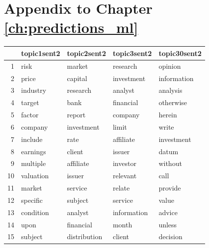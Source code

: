 
\section{Appendix to Chapter \ref{ch:predictions_ml}}

\begin{table}[ht]
\centering
\begin{tabular}{rllll}
  \hline
 & topic1sent2 & topic2sent2 & topic3sent2 & topic30sent2 \\ 
  \hline
1 & risk & market & research & opinion \\ 
  2 & price & capital & investment & information \\ 
  3 & industry & research & analyst & analysis \\ 
  4 & target & bank & financial & otherwise \\ 
  5 & factor & report & company & herein \\ 
  6 & company & investment & limit & write \\ 
  7 & include & rate & affiliate & investment \\ 
  8 & earnings & client & issuer & datum \\ 
  9 & multiple & affiliate & investor & without \\ 
  10 & valuation & issuer & relevant & call \\ 
  11 & market & service & relate & provide \\ 
  12 & specific & subject & service & value \\ 
  13 & condition & analyst & information & advice \\ 
  14 & upon & financial & month & unless \\ 
  15 & subject & distribution & client & decision \\ 
   \hline
\end{tabular}\label{tab:postProbSent2}
\end{table}






